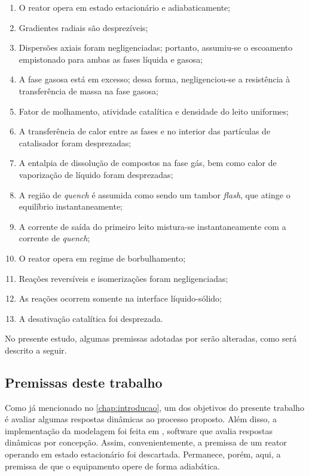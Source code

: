 \begin{enumerate}
  \item O reator opera em estado estacionário e adiabaticamente;
  \item Gradientes radiais são desprezíveis;
  \item Dispersões axiais foram negligenciadas; portanto, assumiu-se o
  escoamento empistonado para ambas as fases líquida e gasosa;
  \item A fase gasosa está em excesso; dessa forma, negligenciou-se a
  resistência à transferência de massa na fase gasosa;
  \item Fator de molhamento, atividade catalítica e densidade do leito
  uniformes;
  \item A transferência de calor entre as fases e no interior das partículas de
  catalisador foram desprezadas;
  \item A entalpia de dissolução de compostos na fase gás, bem como calor de
  vaporização de líquido foram desprezadas;
  \item A região de \emph{quench} é assumida como sendo um tambor \emph{flash},
  que atinge o equilíbrio instantaneamente;
  \item A corrente de saída do primeiro leito mistura-se instantaneamente com a
  corrente de \emph{quench};
  \item O reator opera em regime de borbulhamento;
  \item Reações reversíveis e isomerizações foram negligenciadas;
  \item As reações ocorrem somente na interface líquido-sólido;
  \item A desativação catalítica foi desprezada.
\end{enumerate}

No presente estudo, algumas premissas adotadas por  serão
alteradas, como será descrito a seguir. 

\subsection{Premissas deste trabalho} \label{sec:premissasdestetrabalho}

Como já mencionado no \autoref{chap:introducao}, um dos objetivos do presente
trabalho é avaliar algumas respostas dinâmicas ao processo proposto. Além disso,
a implementação da modelagem foi feita em \emso, software que avalia respostas
dinâmicas por concepção. Assim, convenientemente, a premissa de um reator
operando em estado estacionário foi descartada. Permanece, porém, aqui, a
premissa de que o equipamento opere de forma adiabática.

